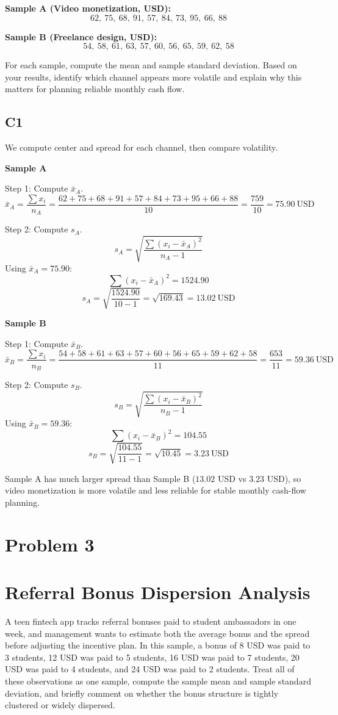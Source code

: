\begin{ExamProblems}
		\textbf{Sample A (Video monetization, USD):}
		\[62,\ 75,\ 68,\ 91,\ 57,\ 84,\ 73,\ 95,\ 66,\ 88\]

		\textbf{Sample B (Freelance design, USD):}
		\[54,\ 58,\ 61,\ 63,\ 57,\ 60,\ 56,\ 65,\ 59,\ 62,\ 58\]

		For each sample, compute the mean and sample standard deviation. Based on your results, identify which channel appears more volatile and explain why this matters for planning reliable monthly cash flow.

		\subsection*{C1}
		We compute center and spread for each channel, then compare volatility.

		\textbf{Sample A}

		Step 1: Compute $\bar{x}_A$.
		\[
		\bar{x}_A = \frac{\sum x_i}{n_A}
		= \frac{62+75+68+91+57+84+73+95+66+88}{10}
		= \frac{759}{10}
		= 75.90\ \text{USD}
		\]

		Step 2: Compute $s_A$.
		\[
		s_A = \sqrt{\frac{\sum (x_i-\bar{x}_A)^2}{n_A-1}}
		\]
		Using $\bar{x}_A=75.90$:
		\[
		\sum (x_i-\bar{x}_A)^2 = 1524.90
		\]
		\[
		s_A = \sqrt{\frac{1524.90}{10-1}} = \sqrt{169.43} = 13.02\ \text{USD}
		\]

		\textbf{Sample B}

		Step 1: Compute $\bar{x}_B$.
		\[
		\bar{x}_B = \frac{\sum x_i}{n_B}
		= \frac{54+58+61+63+57+60+56+65+59+62+58}{11}
		= \frac{653}{11}
		= 59.36\ \text{USD}
		\]

		Step 2: Compute $s_B$.
		\[
		s_B = \sqrt{\frac{\sum (x_i-\bar{x}_B)^2}{n_B-1}}
		\]
		Using $\bar{x}_B=59.36$:
		\[
		\sum (x_i-\bar{x}_B)^2 = 104.55
		\]
		\[
		s_B = \sqrt{\frac{104.55}{11-1}} = \sqrt{10.45} = 3.23\ \text{USD}
		\]

		Sample A has much larger spread than Sample B ($13.02$ USD vs $3.23$ USD), so video monetization is more volatile and less reliable for stable monthly cash-flow planning.

		\newpage
		\item
		\section{Problem 3}
		\section{Referral Bonus Dispersion Analysis}
		A teen fintech app tracks referral bonuses paid to student ambassadors in one week, and management wants to estimate both the average bonus and the spread before adjusting the incentive plan. In this sample, a bonus of 8 USD was paid to 3 students, 12 USD was paid to 5 students, 16 USD was paid to 7 students, 20 USD was paid to 4 students, and 24 USD was paid to 2 students. Treat all of these observations as one sample, compute the sample mean and sample standard deviation, and briefly comment on whether the bonus structure is tightly clustered or widely dispersed.


\end{ExamProblems}

